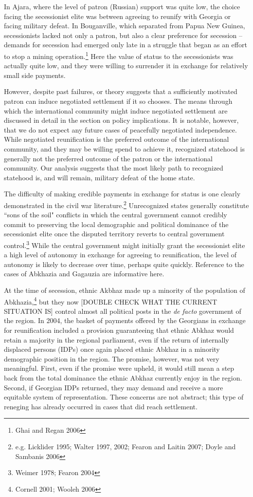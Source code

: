 \documentclass[12pt,letterpaper, notitlepage]{article}
\begin{document}
In Ajara, where the level of patron (Russian) support was quite low, the choice facing the secessionist elite was between agreeing to reunify with Georgia or facing military defeat. In Bouganville, which separated from Papua New Guinea, secessionists lacked not only a patron, but also a clear preference for secession -- demands for secession had emerged only late in a struggle that began as an effort to stop a mining operation.\footnote{Ghai and Regan 2006}  Here the value of status to the secessionists was actually quite low, and they were willing to surrender it in exchange for relatively small side payments.

However, despite past failures, or theory suggests that a sufficiently motivated patron can induce negotiated settlement if it so chooses. The means through which the international community might induce negotiated settlement are discussed in detail in the section on policy implications. It is notable, however, that we do not expect any future cases of peacefully negotiated independence.  While negotiated reunification is the preferred outcome of the international community, and they may be willing spend to achieve it, recognized statehood is generally not the preferred outcome of the patron or the international community. Our analysis suggests that the most likely path to recognized statehood is, and will remain, military defeat of the home state.

The difficulty of making credible payments in exchange for status is one clearly demonstrated in the civil war literature.\footnote{e.g. Licklider 1995; Walter 1997, 2002; Fearon and Laitin 2007; Doyle and Sambanis 2006} Unrecognized states generally constitute ``sons of the soil" conflicts in which the central government cannot credibly commit to preserving the local demographic and political dominance of the secessionist elite once the disputed territory reverts to central government control.\footnote{Weimer 1978; Fearon 2004}  While the central government might initially grant the secessionist elite a high level of autonomy in exchange for agreeing to reunification, the level of autonomy is likely to decrease over time, perhaps quite quickly.  Reference to the cases of Abkhazia and Gagauzia are informative here.

At the time of secession, ethnic Akbhaz made up a minority of the population of Abkhazia,\footnote{Cornell 2001; Wooleh 2006} but they now [DOUBLE CHECK WHAT THE CURRENT SITUATION IS] control almost all political posts in the \textit{de facto} government of the region. In 2004, the basket of payments offered by the Georgians in exchange for reunification included a provision guaranteeing that ethnic Abkhaz would retain a majority in the regional parliament, even if the return of internally displaced persons (IDPs) once again placed ethnic Abkhaz in a minority demographic position in the region. The promise, however, was not very meaningful.  First, even if the promise were upheld, it would still mean a step back from the total dominance the ethnic Abkhaz currently enjoy in the region.  Second, if Georgian IDPs returned, they may demand and receive a more equitable system of representation.  These concerns are not abstract; this type of reneging has already occurred in cases that did reach settlement.
\end{document}
